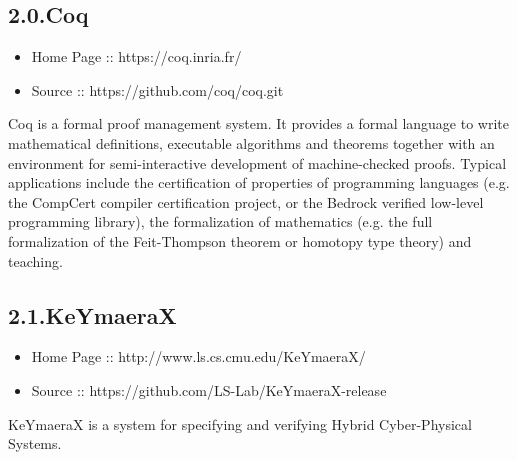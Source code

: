 \documentclass[12pt,twoside]{article}
\begin{document}
\subsection{2.0.\hspace*{0.5em}Coq}\label{sec-coq}%

\begin{itemize}[noitemsep,topsep=\mdcompacttopsep]%

\item{}Home Page :: https://coq.inria.fr/%

\item{}Source :: https://github.com/coq/coq.git%
\end{itemize}%

\noindent{}Coq is a formal proof management system. It provides a formal language
to write mathematical definitions, executable algorithms and theorems
together with an environment for semi-interactive development of
machine-checked proofs. Typical applications include the certification
of properties of programming languages (e.g. the CompCert compiler
certification project, or the Bedrock verified low-level programming
library), the formalization of mathematics (e.g. the full
formalization of the Feit-Thompson theorem or homotopy type theory)
and teaching.%

\subsection{2.1.\hspace*{0.5em}KeYmaeraX}\label{sec-keymaerax}%

\begin{itemize}[noitemsep,topsep=\mdcompacttopsep]%

\item{}Home Page :: http://www.ls.cs.cmu.edu/KeYmaeraX/%

\item{}Source :: https://github.com/LS-Lab/KeYmaeraX-release%
\end{itemize}%

\noindent{}KeYmaeraX is a system for specifying and verifying Hybrid
Cyber-Physical Systems.%
\end{document}
